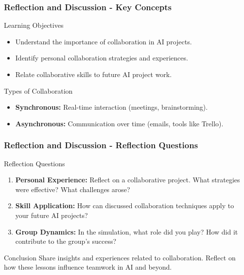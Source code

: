 \documentclass[aspectratio=169]{beamer}
\begin{document}
\begin{frame}[fragile]
    \frametitle{Reflection and Discussion - Key Concepts}
    \begin{block}{Learning Objectives}
        \begin{itemize}
            \item Understand the importance of collaboration in AI projects.
            \item Identify personal collaboration strategies and experiences.
            \item Relate collaborative skills to future AI project work.
        \end{itemize}
    \end{block}

    \begin{block}{Types of Collaboration}
        \begin{itemize}
            \item \textbf{Synchronous:} Real-time interaction (meetings, brainstorming).
            \item \textbf{Asynchronous:} Communication over time (emails, tools like Trello).
        \end{itemize}
    \end{block}
\end{frame}

\begin{frame}[fragile]
    \frametitle{Reflection and Discussion - Reflection Questions}
    \begin{block}{Reflection Questions}
        \begin{enumerate}
            \item \textbf{Personal Experience:} Reflect on a collaborative project. What strategies were effective? What challenges arose?
            \item \textbf{Skill Application:} How can discussed collaboration techniques apply to your future AI projects?
            \item \textbf{Group Dynamics:} In the simulation, what role did you play? How did it contribute to the group's success?
        \end{enumerate}
    \end{block}

    \begin{block}{Conclusion}
        Share insights and experiences related to collaboration. Reflect on how these lessons influence teamwork in AI and beyond.
    \end{block}
\end{frame}
\end{document}
